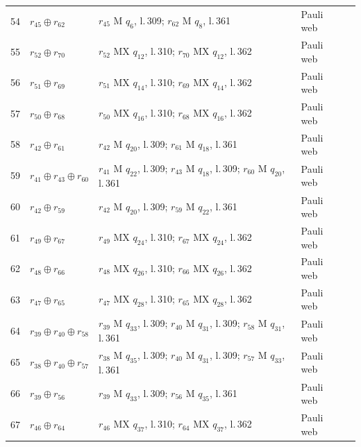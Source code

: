 \documentclass[11pt]{article}
\begin{document}
\begin{semiwebaddition}
{\begin{longtable}{rp{.3\linewidth}p{.43\linewidth}lr}
54 & $r_{45}\oplus r_{62}$ & $r_{45}$ M $q_{6}$, l.\,309; $r_{62}$ M $q_{8}$, l.\,361 & Pauli web & \hyperref[d5_det054]{\pageref*{d5_det054}}\\
55 & $r_{52}\oplus r_{70}$ & $r_{52}$ MX $q_{12}$, l.\,310; $r_{70}$ MX $q_{12}$, l.\,362 & Pauli web & \hyperref[d5_det055]{\pageref*{d5_det055}}\\
56 & $r_{51}\oplus r_{69}$ & $r_{51}$ MX $q_{14}$, l.\,310; $r_{69}$ MX $q_{14}$, l.\,362 & Pauli web & \hyperref[d5_det056]{\pageref*{d5_det056}}\\
57 & $r_{50}\oplus r_{68}$ & $r_{50}$ MX $q_{16}$, l.\,310; $r_{68}$ MX $q_{16}$, l.\,362 & Pauli web & \hyperref[d5_det057]{\pageref*{d5_det057}}\\
58 & $r_{42}\oplus r_{61}$ & $r_{42}$ M $q_{20}$, l.\,309; $r_{61}$ M $q_{18}$, l.\,361 & Pauli web & \hyperref[d5_det058]{\pageref*{d5_det058}}\\
59 & $r_{41}\oplus r_{43}\oplus r_{60}$ & $r_{41}$ M $q_{22}$, l.\,309; $r_{43}$ M $q_{18}$, l.\,309; $r_{60}$ M $q_{20}$, l.\,361 & Pauli web & \hyperref[d5_det059]{\pageref*{d5_det059}}\\
60 & $r_{42}\oplus r_{59}$ & $r_{42}$ M $q_{20}$, l.\,309; $r_{59}$ M $q_{22}$, l.\,361 & Pauli web & \hyperref[d5_det060]{\pageref*{d5_det060}}\\
61 & $r_{49}\oplus r_{67}$ & $r_{49}$ MX $q_{24}$, l.\,310; $r_{67}$ MX $q_{24}$, l.\,362 & Pauli web & \hyperref[d5_det061]{\pageref*{d5_det061}}\\
62 & $r_{48}\oplus r_{66}$ & $r_{48}$ MX $q_{26}$, l.\,310; $r_{66}$ MX $q_{26}$, l.\,362 & Pauli web & \hyperref[d5_det062]{\pageref*{d5_det062}}\\
63 & $r_{47}\oplus r_{65}$ & $r_{47}$ MX $q_{28}$, l.\,310; $r_{65}$ MX $q_{28}$, l.\,362 & Pauli web & \hyperref[d5_det063]{\pageref*{d5_det063}}\\
64 & $r_{39}\oplus r_{40}\oplus r_{58}$ & $r_{39}$ M $q_{33}$, l.\,309; $r_{40}$ M $q_{31}$, l.\,309; $r_{58}$ M $q_{31}$, l.\,361 & Pauli web & \hyperref[d5_det064]{\pageref*{d5_det064}}\\
65 & $r_{38}\oplus r_{40}\oplus r_{57}$ & $r_{38}$ M $q_{35}$, l.\,309; $r_{40}$ M $q_{31}$, l.\,309; $r_{57}$ M $q_{33}$, l.\,361 & Pauli web & \hyperref[d5_det065]{\pageref*{d5_det065}}\\
66 & $r_{39}\oplus r_{56}$ & $r_{39}$ M $q_{33}$, l.\,309; $r_{56}$ M $q_{35}$, l.\,361 & Pauli web & \hyperref[d5_det066]{\pageref*{d5_det066}}\\
67 & $r_{46}\oplus r_{64}$ & $r_{46}$ MX $q_{37}$, l.\,310; $r_{64}$ MX $q_{37}$, l.\,362 & Pauli web & \hyperref[d5_det067]{\pageref*{d5_det067}}\\

\end{longtable}}
\end{semiwebaddition}
\end{document}

